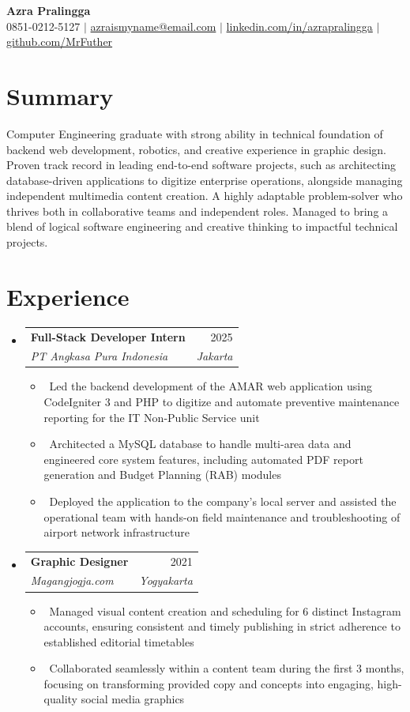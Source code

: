 \documentclass[letterpaper,10pt]{article}
\makeatletter
\newcommand{\resumeItem}[1]{\item\small{#1}}
\newcommand{\resumeSubheading}[4]{
\vspace{-1pt}\item
  \begin{tabular*}{0.97\textwidth}[t]{l@{\extracolsep{\fill}}r}
    \textbf{#1} & #2 \\
    \textit{#3} & \textit{#4} \\
  \end{tabular*}\vspace{-7pt}
}
\newcommand{\resumeSubHeadingList}{\begin{itemize}[leftmargin=0.15in, label={}]}
\newcommand{\resumeSubHeadingListEnd}{\end{itemize}}
\makeatother
\begin{document}
\begin{center}
  \textbf{\Huge Azra Pralingga} \\
  \small 0851-0212-5127 $|$ \href{mailto:azraismyname@email.com}{azraismyname@email.com} $|$ 
  \href{https://linkedin.com/in/azrapralingga}{linkedin.com/in/azrapralingga} $|$
  \href{https://github.com/MrFuther}{github.com/MrFuther}
\end{center}

\section*{Summary}
Computer Engineering graduate with strong ability in technical foundation of backend web development, robotics, and creative experience in graphic design. Proven track record in leading end-to-end software projects, such as architecting database-driven applications to digitize enterprise operations, alongside managing independent multimedia content creation. A highly adaptable problem-solver who thrives both in collaborative teams and independent roles. Managed to bring a blend of logical software engineering and creative thinking to impactful technical projects.

\section{Experience}
\resumeSubHeadingList
  \resumeSubheading
      {Full-Stack Developer Intern}{2025}
      {PT Angkasa Pura Indonesia}{Jakarta}
      \resumeSubHeadingList
          \resumeItem{\textbullet\ Led the backend development of the AMAR web application using CodeIgniter 3 and PHP to digitize and automate preventive maintenance reporting for the IT Non-Public Service unit}
          \resumeItem{\textbullet\ Architected a  MySQL database to handle multi-area data and engineered core system features, including automated PDF report generation and Budget Planning (RAB) modules}
          \resumeItem{\textbullet\ Deployed the application to the company's local server and assisted the operational team with hands-on field maintenance and troubleshooting of airport network infrastructure}
      \resumeSubHeadingListEnd
  \resumeSubheading
      {Graphic Designer}{2021}
      {Magangjogja.com}{Yogyakarta}
      \resumeSubHeadingList
          \resumeItem{\textbullet\ Managed visual content creation and scheduling for 6 distinct Instagram accounts, ensuring consistent and timely publishing in strict adherence to established editorial timetables}
          \resumeItem{\textbullet\ Collaborated seamlessly within a content team during the first 3 months, focusing on transforming provided copy and concepts into engaging, high-quality social media graphics}
      \resumeSubHeadingListEnd
\resumeSubHeadingListEnd
\end{document}
